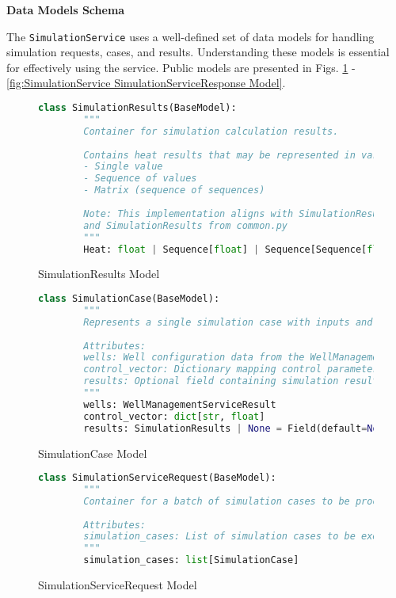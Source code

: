 \textbf{Data Models Schema}

The \texttt{SimulationService} uses a well-defined set of data models for handling simulation requests, cases, and results. Understanding these models is essential for effectively using the service. Public models are presented in Figs. \ref{fig:SimulationService SimulationResults Model} - \ref{fig:SimulationService SimulationServiceResponse Model}.

\begin{figure}[H]
	\begin{lstlisting}[language=Python]
		class SimulationResults(BaseModel):
		"""
		Container for simulation calculation results.
		
		Contains heat results that may be represented in various formats:
		- Single value
		- Sequence of values
		- Matrix (sequence of sequences)
		
		Note: This implementation aligns with SimulationResultType 
		and SimulationResults from common.py
		"""
		Heat: float | Sequence[float] | Sequence[Sequence[float] | float]
	\end{lstlisting}
	\caption{SimulationResults Model}
	\label{fig:SimulationService SimulationResults Model}
\end{figure}

\begin{figure}[H]
	\begin{lstlisting}[language=Python]
		class SimulationCase(BaseModel):
		"""
		Represents a single simulation case with inputs and optional results.
		
		Attributes:
		wells: Well configuration data from the WellManagement service
		control_vector: Dictionary mapping control parameters to their values
		results: Optional field containing simulation results when completed
		"""
		wells: WellManagementServiceResult
		control_vector: dict[str, float]
		results: SimulationResults | None = Field(default=None)
	\end{lstlisting}
	\caption{SimulationCase Model}
	\label{fig:SimulationService SimulationCase Model}
\end{figure}

\begin{figure}[H]
	\begin{lstlisting}[language=Python]
		class SimulationServiceRequest(BaseModel):
		"""
		Container for a batch of simulation cases to be processed.
		
		Attributes:
		simulation_cases: List of simulation cases to be executed
		"""
		simulation_cases: list[SimulationCase]
	\end{lstlisting}
	\caption{SimulationServiceRequest Model}
	\label{fig:SimulationService SimulationServiceRequest Model}
\end{figure}

